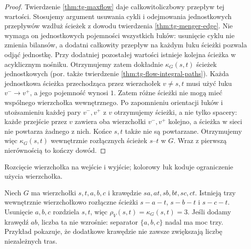 \begin{proof}
Twierdzenie \ref{thm:tg-maxflow} daje całkowitoliczbowy
przepływ tej wartości. Stosujemy argument usuwania cykli i odejmowania
jednostkowych przepływów wzdłuż ścieżek z dowodu
twierdzenia \ref{thm:tg-menger-edge}. Nie wymaga
on jednostkowych pojemności wszystkich łuków:
usunięcie cyklu nie zmienia bilansów, a dodatni
całkowity przepływ na każdym łuku ścieżki pozwala
odjąć jednostkę. Przy dodatniej pozostałej wartości
istnieje kolejna ścieżka w acyklicznym nośniku.
Otrzymujemy zatem dokładnie $\kappa_G(s,t)$
ścieżek jednostkowych (por. także twierdzenie
\ref{thm:tg-flow-integral-paths}). Każda jednostkowa
ścieżka przechodząca przez wierzchołek $v\ne s,t$
musi użyć łuku $v^-\to v^+$, a jego pojemność wynosi $1$.
Zatem różne ścieżki nie mogą mieć wspólnego wierzchołka
wewnętrznego. Po zapomnieniu orientacji łuków
i utożsamieniu każdej pary $v^-,v^+$ z $v$
otrzymujemy ścieżki, a nie tylko spacery:
każde przejście przez $v$ zawiera oba wierzchołki
$v^-,v^+$ kolejno, a ścieżka w sieci nie powtarza
żadnego z nich. Końce $s,t$ także nie są powtarzane.
Otrzymujemy więc $\kappa_G(s,t)$ wewnętrznie rozłącznych
ścieżek $s$--$t$ w $G$. Wraz z pierwszą nierównością
to kończy dowód.
\end{proof}

\begin{center}

{\footnotesize Rozcięcie wierzchołka na wejście i wyjście;
kolorowy łuk koduje ograniczenie użycia wierzchołka.}
\end{center}

\begin{przyklad}
Niech $G$ ma wierzchołki $s,t,a,b,c$ i krawędzie
$sa,at,sb,bt,sc,ct$. Istnieją trzy wewnętrznie
wierzchołkowo rozłączne ścieżki $s\! -\!a\! -\! t$,
$s\! -\! b\! -\! t$ i $s\! -\! c\! -\! t$.
Usunięcie $a,b,c$ rozdziela $s,t$, więc
$\rho_V(s,t)=\kappa_G(s,t)=3$.
Jeśli dodamy krawędź $ab$, liczba ta nie wzrośnie:
separator $\{a,b,c\}$ nadal ma moc trzy.
Przykład pokazuje, że dodatkowe krawędzie nie zawsze
zwiększają liczbę niezależnych tras.
\end{przyklad}

